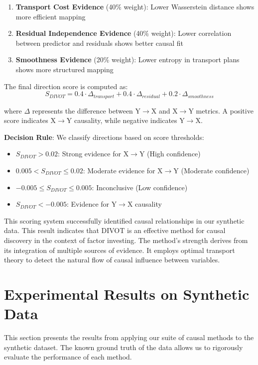 \begin{enumerate}
    \item \textbf{Transport Cost Evidence} (40\% weight): Lower Wasserstein distance shows more efficient mapping
    \item \textbf{Residual Independence Evidence} (40\% weight): Lower correlation between predictor and residuals shows better causal fit  
    \item \textbf{Smoothness Evidence} (20\% weight): Lower entropy in transport plans shows more structured mapping
\end{enumerate}

The final direction score is computed as:
$$S_{DIVOT} = 0.4 \cdot \Delta_{transport} + 0.4 \cdot \Delta_{residual} + 0.2 \cdot \Delta_{smoothness}$$

where $\Delta$ represents the difference between Y$\rightarrow$X and X$\rightarrow$Y metrics. A positive score indicates X$\rightarrow$Y causality, while negative indicates Y$\rightarrow$X.

\textbf{Decision Rule}: We classify directions based on score thresholds:
\begin{itemize}
    \item $S_{DIVOT} > 0.02$: Strong evidence for X$\rightarrow$Y (High confidence)
    \item $0.005 < S_{DIVOT} \leq 0.02$: Moderate evidence for X$\rightarrow$Y (Moderate confidence)  
    \item $-0.005 \leq S_{DIVOT} \leq 0.005$: Inconclusive (Low confidence)
    \item $S_{DIVOT} < -0.005$: Evidence for Y$\rightarrow$X causality
\end{itemize}

This scoring system successfully identified causal relationships in our synthetic data. This result indicates that DIVOT is an effective method for causal discovery in the context of factor investing. The method's strength derives from its integration of multiple sources of evidence. It employs optimal transport theory to detect the natural flow of causal influence between variables.

\section{Experimental Results on Synthetic Data}
\label{sec:synthetic_results}

This section presents the results from applying our suite of causal methods to the synthetic dataset. The known ground truth of the data allows us to rigorously evaluate the performance of each method.

